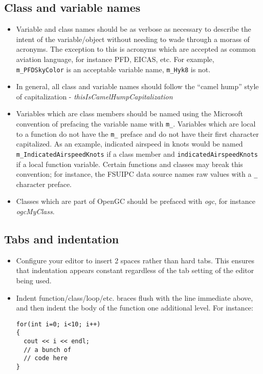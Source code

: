 \documentclass[11pt]{article}
\begin{document}
\subsection{Class and variable names}

\begin{itemize}

\item Variable and class names should be as verbose as necessary to describe the intent of the variable/object without needing to wade through a morass of acronyms. The exception to this is acronyms which are accepted as common aviation language, for instance PFD, EICAS, etc. For example, \texttt{m\_PFDSkyColor} is an acceptable variable name, \texttt{m\_Hyk8} is not.

\item In general, all class and variable names should follow the ``camel hump'' style of capitalization - \emph{thisIsCamelHumpCapitalization}

\item Variables which are class members should be named using the Microsoft convention of prefacing the variable name with \texttt{m\_}. Variables which are local to a function do not have the \texttt{m\_} preface and do not have their first character capitalized. As an example, indicated airspeed in knots would be named \texttt{m\_IndicatedAirspeedKnots} if a class member and \texttt{indicatedAirspeedKnots} if a local function variable. Certain functions and classes may break this convention; for instance, the FSUIPC data source names raw values with a \texttt{\_} character preface.

\item Classes which are part of OpenGC should be prefaced with \emph{ogc}, for instance \emph{ogcMyClass}.

\end{itemize}

\subsection{Tabs and indentation}

\begin{itemize}

\item Configure your editor to insert 2 spaces rather than hard tabs. This ensures that indentation appears constant regardless of the tab setting of the editor being used.

\item Indent function/class/loop/etc. braces flush with the line immediate above, and then indent the body of the function one additional level. For instance:
\begin{verbatim}
for(int i=0; i<10; i++)
{
  cout << i << endl;
  // a bunch of
  // code here
}
\end{verbatim}
\end{itemize}
\end{document}
